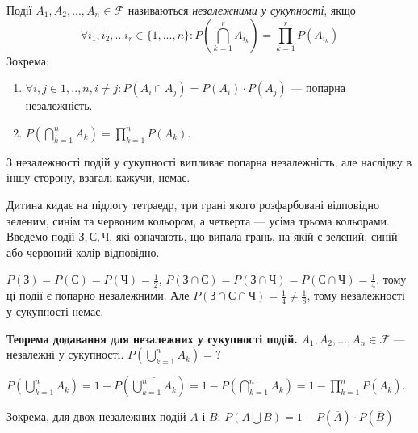\begin{definition}
    Події $A_1, A_2, ..., A_n \in \mathcal{F}$ називаються \emph{незалежними у сукупності}, якщо
    \begin{equation}\label{eq:indep}
        \forall i_1, i_2, ... i_r \in \{1,...,n\}: P\left(\bigcap\limits_{k=1}^r A_{i_k}\right) = \prod\limits_{k=1}^r P\left(A_{i_k}\right)
    \end{equation}
    Зокрема:
    \nopagebreak
    \begin{enumerate}
        \item $\forall i, j \in {1,..,n}, i\neq j: P(A_i \cap A_j) = P(A_i)\cdot P(A_j)$ --- попарна незалежність.
        \item $P\left(\bigcap\limits_{k=1}^n A_k\right) = \prod\limits_{k=1}^n P(A_k)$.
    \end{enumerate}
\end{definition}
\begin{remark}
    З незалежності подій у сукупності випливає попарна незалежність, 
    але наслідку в іншу сторону, взагалі кажучи, немає.
\end{remark}
\begin{example}
    Дитина кидає на підлогу тетраедр, три грані якого розфарбовані відповідно зеленим, синім та червоним кольором,
    а четверта --- усіма трьома кольорами. Введемо події $\text{З}, \text{С}, \text{Ч}$, які означають, що випала грань,
    на якій є зелений, синій або червоний колір відповідно.

    $P(\text{З}) = P(\text{С}) = P(\text{Ч}) = \frac{1}{2}$, 
    $P(\text{З} \cap \text{С}) = P(\text{З} \cap \text{Ч}) = P(\text{С} \cap \text{Ч}) = \frac{1}{4}$,
    тому ці події є попарно незалежними. Але $P(\text{З} \cap \text{С} \cap \text{Ч}) = \frac{1}{4} \neq \frac{1}{8}$,
    тому незалежності у сукупності немає.
\end{example}

\noindent \textbf{Теорема додавання для незалежних у сукупності подій.}
$A_1, A_2, ..., A_n \in \mathcal{F}$ --- незалежні у сукупності.
$P\left(\bigcup\limits_{k=1}^n A_k\right) = \text{?}$

$P\left(\bigcup\limits_{k=1}^n A_k\right) = 1 - P\left(\overline{\bigcup\limits_{k=1}^n A_k}\right) = 1 - P\left(\bigcap\limits_{k=1}^n \overline{A_k}\right) = 1 - \prod\limits_{k=1}^n P(\overline{A_k})$.

\noindent Зокрема, для двох незалежних подій $A$ і $B$: $P(A\bigcup B) = 1 - P(\overline{A}) \cdot P(\overline{B})$

